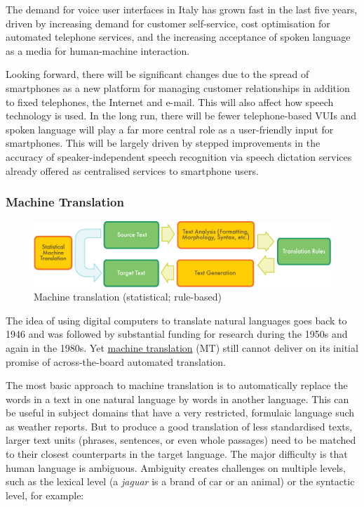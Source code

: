 \documentclass[]{../../metanetpaper}
\begin{document}
\begin{multicols}{2}
The demand for voice user interfaces in Italy has grown fast in the last five years, driven by increasing demand for customer self-service, cost optimisation for automated telephone services, and the increasing acceptance of spoken language as a media for human-machine interaction.

Looking forward, there will be significant changes due to the spread of smartphones as a new platform for managing customer relationships in addition to fixed telephones, the Internet and e-mail. This will also affect how speech technology is used. In the long run, there will be fewer telephone-based VUIs and spoken language will play a far more central role as a user-friendly input for smartphones. This will be largely driven by stepped improvements in the accuracy of speaker-independent speech recognition via speech dictation services already offered as centralised services to smartphone users.



\subsubsection{Machine Translation}

\begin{figure}[htb]
  \center
  \includegraphics[width=\textwidth]{../_media/english/machine_translation}
  \caption{Machine translation (statistical; rule-based)}
  \label{fig:mtarch_en}
\end{figure}

The idea of using digital computers to translate natural languages goes back to 1946 and was followed by substantial funding for research during the 1950s and again in the 1980s. Yet \underline{machine translation} (MT) still cannot deliver on its initial promise of across-the-board automated translation.  



The most basic approach to machine translation is to automatically replace the words in a text in one natural language by words in another language. This can be useful in subject domains that have a very restricted, formulaic language such as weather reports. But to produce a good translation of less standardised texts, larger text units (phrases, sentences, or even whole passages) need to be matched to their closest counterparts in the target language. The major difficulty is that human language is ambiguous. Ambiguity creates challenges on multiple levels, such as the lexical level (a \emph{jaguar} is a brand of car or an animal) or the syntactic level, for example:




\end{multicols}
\end{document}
